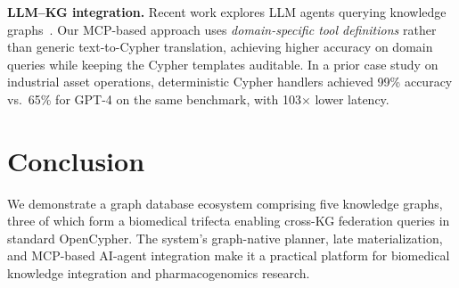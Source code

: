 \documentclass[sigconf]{acmart}
\begin{document}
\smallskip\noindent\textbf{LLM--KG integration.}
Recent work explores LLM agents querying knowledge
graphs~\cite{pan2024unifying}.
Our MCP-based approach uses \emph{domain-specific tool
definitions} rather than generic text-to-Cypher translation,
achieving higher accuracy on domain queries while keeping the
Cypher templates auditable.  In a prior case study on industrial
asset operations, deterministic Cypher handlers achieved 99\%
accuracy vs.\ 65\% for GPT-4 on the same benchmark, with 103$\times$
lower latency.

\section{Conclusion}

We demonstrate a graph database ecosystem comprising five knowledge
graphs, three of which form a biomedical trifecta enabling cross-KG
federation queries in standard OpenCypher.  The system's graph-native
planner, late materialization, and MCP-based AI-agent integration
make it a practical platform for biomedical knowledge integration
and pharmacogenomics research.
\end{document}
